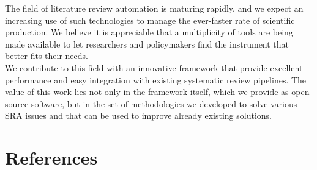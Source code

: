 \documentclass{article}
\begin{document}
The field of literature review automation is maturing rapidly, and we
expect an increasing use of such technologies to manage the ever-faster
rate of scientific production. We believe it is appreciable that a
multiplicity of tools are being made available to let researchers and
policymakers find the instrument that better fits their needs.\\
We contribute to this field with an innovative framework that provide
excellent performance and easy integration with existing systematic
review pipelines. The value of this work lies not only in the framework
itself, which we provide as open-source software, but in the set of
methodologies we developed to solve various SRA issues and that can be
used to improve already existing solutions.

\newpage

\hypertarget{references}{%
\section*{References}\label{references}}
\end{document}
